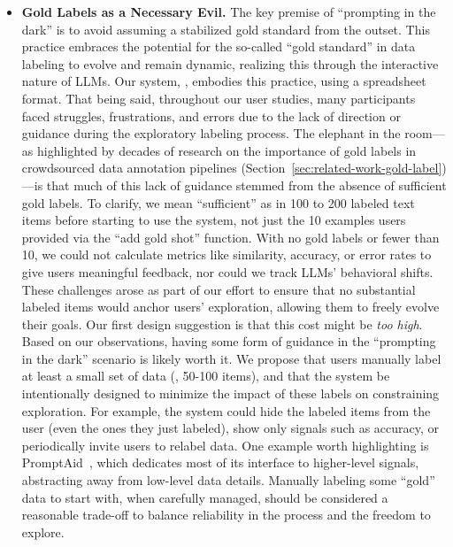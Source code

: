 \begin{itemize}

\item 
\textbf{Gold Labels as a Necessary Evil.}
The key premise of ``prompting in the dark'' is to avoid assuming a stabilized gold standard from the outset.
This practice embraces the potential for the so-called ``gold standard'' in data labeling to evolve and remain dynamic, realizing this through the interactive nature of LLMs. 
Our system, \system, embodies this practice, using a spreadsheet format.
That being said, throughout our user studies, many participants faced struggles, frustrations, and errors due to the lack of direction or guidance during the exploratory labeling process. 
The elephant in the room---as highlighted by decades of research on the importance of gold labels in crowdsourced data annotation pipelines (Section~\ref{sec:related-work-gold-label})---is that much of this lack of guidance stemmed from the absence of sufficient gold labels. %
To clarify, we mean ``sufficient'' as in 100 to 200 labeled text items before starting to use the system, not just the 10 examples users provided via the ``add gold shot'' function.
With no gold labels or fewer than 10, we could not calculate metrics like similarity, accuracy, or error rates to give users meaningful feedback, nor could we track LLMs' behavioral shifts.
These challenges arose as part of our effort to ensure that no substantial labeled items would anchor users' exploration, allowing them to freely evolve their goals.
Our first design suggestion is that this cost might be \textit{too high}.
Based on our observations, having some form of guidance in the ``prompting in the dark'' scenario is likely worth it. 
We propose that users manually label at least a small set of data (\eg, 50-100 items), and that the system be intentionally designed to minimize the impact of these labels on constraining exploration. 
For example, the system could hide the labeled items from the user (even the ones they just labeled), show only signals such as accuracy, or periodically invite users to relabel data.
One example worth highlighting is PromptAid~\cite{mishra2023promptaid}, which dedicates most of its interface to higher-level signals, abstracting away from low-level data details.
Manually labeling some ``gold'' data to start with, when carefully managed, should be considered a reasonable trade-off to balance reliability in the process and the freedom to explore.


\end{itemize}
